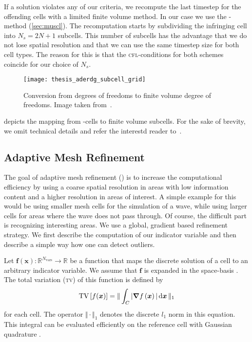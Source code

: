 If a solution violates any of our criteria, we recompute the last timestep for the offending cells with a limited finite volume method.
In our case we use the \muscl{}-method (\cref{sec:muscl}).
The recomputation starts by subdividing the infringing cell into $N_s = 2N + 1$ subcells.
This number of subcells has the advantage that we do not lose spatial resolution and that we can use the same timestep size for both cell types.
The reason for this is that the \textsc{cfl}-conditions for both schemes  coincide for our choice of $N_s$.
\begin{figure}[htb]
  \centering
  \texttt{[image: thesis\_aderdg\_subcell\_grid]}
  \caption{\label{fig:limiting-subcells}Conversion from \dg{} degrees of freedoms to finite volume degree of freedoms. Image taken from~\cite{dumbser2018conformal}. }
\end{figure}

 depicts the mapping from \dg{}-cells to finite volume subcells.
For the sake of brevity, we omit technical details and refer the interestd reader to~\cite{dumbser2016simple}.

\subsection{Adaptive Mesh Refinement}\label{sec:amr}
The goal of adaptive mesh refinement (\amr{}) is to increase the computational efficiency by using a coarse spatial resolution in areas with low information content and a higher resolution in areas of interest.
A simple example for this would be using smaller mesh cells for the simulation of a wave, while using larger cells for areas where the wave does not pass through.
Of course, the difficult part is recognizing interesting areas.
We use a global, gradient based refinement strategy.
We first describe the computation of our indicator variable and then describe a simple way how one can detect outliers.

Let $\bm{f}(\bm{x}): \mathbb{R}^{N_\text{vars}} \to \mathbb{R}$ be a function that maps the discrete solution of a cell to an arbitrary indicator variable.
We assume that $\bm{f}$ is expanded in the space-basis .
The total variation (\textsc{tv}) of this function is defined by
\begin{equation}
  \label{eq:tv}
  \tv \left[ f(\bm{x}) \right] =
  \Vert
\intdcell{ \vert \gradient{f \left( \bm{x} \right)} \vert }
\Vert_1
\end{equation}
for each cell.
The operator $\Vert \cdot \Vert_1$ denotes the discrete $l_1$ norm in this equation.
This integral can be evaluated efficiently on the reference cell  with Gaussian quadrature .

